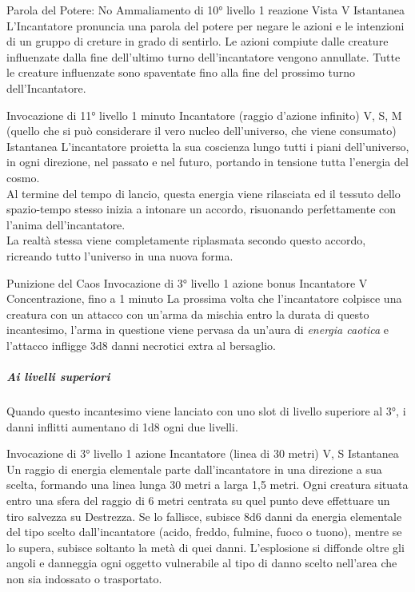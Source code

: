 \DndSpellHeader%
  {Parola del Potere: No}
  {Ammaliamento di 10° livello}
  {1 reazione}
  {Vista}
  {V}
  {Istantanea}
L'Incantatore pronuncia una parola del potere per negare le azioni e le intenzioni di un gruppo di creture in grado di sentirlo.
Le azioni compiute dalle creature influenzate dalla fine dell'ultimo turno dell'incantatore vengono annullate.
Tutte le creature influenzate sono spaventate fino alla fine del prossimo turno dell'Incantatore.

{Invocazione di 11° livello}
{1 minuto}
{Incantatore (raggio d'azione infinito)}
{V, S, M (quello che si può considerare il vero nucleo dell'universo, che viene consumato)}
{Istantanea}
L'incantatore proietta la sua coscienza lungo tutti i piani dell'universo, in ogni direzione, nel passato e nel futuro, portando in tensione tutta l'energia del cosmo. \\ Al termine del tempo di lancio, questa energia viene rilasciata ed il tessuto dello spazio-tempo stesso inizia a intonare un accordo, risuonando perfettamente con l'anima dell'incantatore. \\ La realtà stessa viene completamente riplasmata secondo questo accordo, ricreando tutto l'universo in una nuova forma.

\DndSpellHeader%
  {Punizione del Caos}
  {Invocazione di 3° livello}
  {1 azione bonus}
  {Incantatore}
  {V}
  {Concentrazione, fino a 1 minuto}
La prossima volta che l'incantatore colpisce una creatura con un attacco con un'arma da mischia entro la durata di questo incantesimo, l'arma in questione viene pervasa da un'aura di \textit{energia caotica} e l'attacco infligge 3d8 danni necrotici extra al bersaglio. 
\subparagraph{Ai livelli superiori}Quando questo incantesimo viene lanciato con uno slot di livello superiore al 3°, i danni inflitti aumentano di 1d8 ogni due livelli.

{Invocazione di 3° livello}
{1 azione}
{Incantatore (linea di 30 metri)}
{V, S}
{Istantanea}
Un raggio di energia elementale parte dall'incantatore in una direzione a sua scelta, formando una linea lunga 30 metri a larga 1,5 metri. Ogni creatura situata entro una sfera del raggio di 6 metri centrata su quel punto deve effettuare un tiro salvezza su Destrezza. Se lo fallisce, subisce 8d6 danni da  energia elementale del tipo scelto dall'incantatore (acido, freddo, fulmine, fuoco o tuono), mentre se lo supera, subisce soltanto la metà di quei danni. 
L'esplosione si diffonde oltre gli angoli e danneggia ogni oggetto vulnerabile al tipo di danno scelto nell'area che non sia indossato o trasportato.

